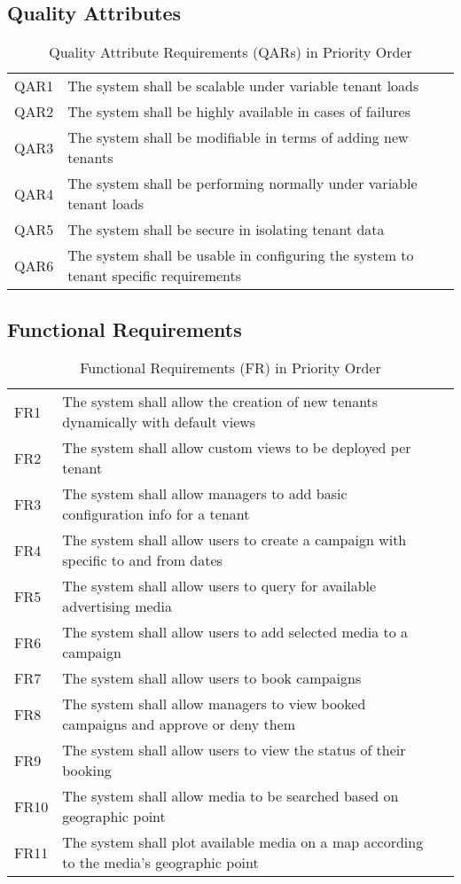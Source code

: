 \subsection{Quality Attributes}
\begin{table}[!h]
\centering
\begin{tabularx}{\linewidth}{|l|X|l}
\cline{1-2}
QAR1 & The system shall be scalable under variable tenant loads &   \\
QAR2 & The system shall be highly available in cases of failures &    \\
QAR3 & The system shall be modifiable in terms of adding new tenants &    \\
QAR4 & The system shall be performing normally under variable tenant loads &    \\
QAR5 & The system shall be secure in isolating tenant data &    \\
QAR6 & The system shall be usable in configuring the system to tenant specific requirements &    \\
\cline{1-2}
\end{tabularx}
\caption{Quality Attribute Requirements (QARs) in Priority Order}
\label{tab:quality_attributes}
\end{table}
\newpage

\subsection{Functional Requirements}
\begin{table}[!h]
\centering
\begin{tabularx}{\linewidth}{|l|X|l}
\cline{1-2}
FR1 & The system shall allow the creation of new tenants dynamically with default views &   \\
FR2 & The system shall allow custom views to be deployed per tenant &    \\
FR3 & The system shall allow managers to add basic configuration info for a tenant &    \\
FR4 & The system shall allow users to create a campaign with specific to and from dates &    \\
FR5 & The system shall allow users to query for available advertising media &    \\
FR6 & The system shall allow users to add selected media to a campaign &    \\
FR7 & The system shall allow users to book campaigns &   \\
FR8 & The system shall allow managers to view booked campaigns and approve or deny them &  \\
FR9 & The system shall allow users to view the status of their booking &   \\
FR10 & The system shall allow media to be searched based on geographic point &   \\
FR11 & The system shall plot available media on a map according to the media's geographic point &   \\
\cline{1-2}
\end{tabularx}
\caption{Functional Requirements (FR) in Priority Order}
\label{tab:functional_requirements}
\end{table}
\newpage

